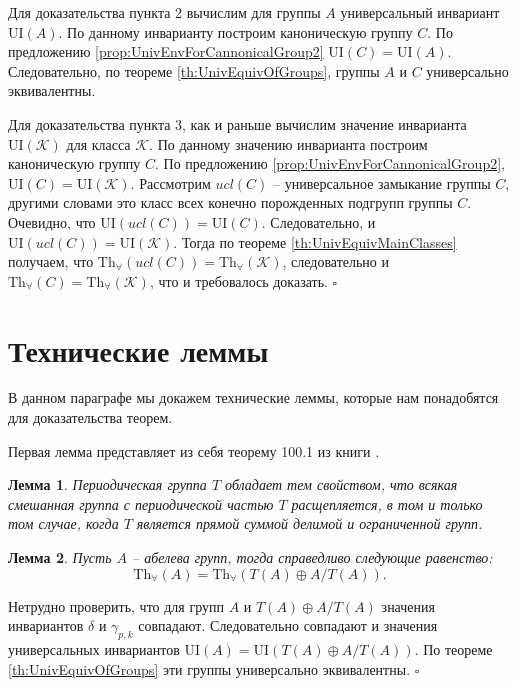 \documentclass[a4paper,11pt,twoside]{article}
\newtheorem{lemma}{Лемма}[section]
\def\proof{{\noindent{\bf Доказательство.}} }
\def\K{{\mathcal{K}}}
\def\Tha{{\mathrm{Th}_\forall}}
\def\ui{{\mathrm{UI}}}
\begin{document}
Для доказательства пункта 2 вычислим для группы $A$ универсальный инвариант $\ui(A)$. По данному инварианту построим каноническую группу $C$. По предложению \ref{prop:UnivEnvForCannonicalGroup2} $\ui(C) = \ui(A)$. Следовательно, по теореме \ref{th:UnivEquivOfGroups}, группы $A$ и $C$ универсально эквивалентны.

Для доказательства пункта 3, как и раньше вычислим значение инварианта $\ui(\K)$ для класса $\K$. По данному значению инварианта построим каноническую группу $C$. По предложению \ref{prop:UnivEnvForCannonicalGroup2}, $\ui(C) = \ui(\K).$ Рассмотрим $ucl(C)$ -- универсальное замыкание группы $C$, другими словами это класс всех конечно порожденных подгрупп группы $C$. Очевидно, что $\ui(ucl(C)) = \ui(C)$. Следовательно, и $\ui(ucl(C)) = \ui(\K)$. Тогда по теореме \ref{th:UnivEquivMainClasses} получаем, что $\Tha(ucl(C)) = \Tha(\K)$, следовательно и $\Tha(C) = \Tha(\K)$, что и требовалось доказать. $\square$






\section{Технические леммы}\label{sec:lemmas}

В данном параграфе мы докажем технические леммы, которые нам понадобятся для доказательства теорем. 

Первая лемма представляет из себя теорему 100.1 из книги \cite{Fuchs2}.

\begin{lemma}\label{lemma:Fuchs}
Периодическая группа $T$ обладает тем свойством, что всякая смешанная группа с периодической частью $T$ расщепляется, в том и только том случае, когда $T$ является прямой суммой делимой и ограниченной групп.
\end{lemma}

\begin{lemma}\label{lemma:UnivEquivATA}
Пусть $A$ -- абелева групп, тогда справедливо следующие равенство:
$$\Tha(A) = \Tha(T(A) \oplus A \big/ T(A)).$$
\end{lemma}

\proof Нетрудно проверить, что для групп $A$ и $T(A) \oplus A \big/ T(A)$ значения инвариантов $\delta$ и $\gamma_{p,k}$ совпадают. Следовательно совпадают и значения универсальных инвариантов $\ui(A) = \ui(T(A) \oplus A \big/ T(A))$. По теореме \ref{th:UnivEquivOfGroups} эти группы универсально эквивалентны. $\square$
\end{document}
